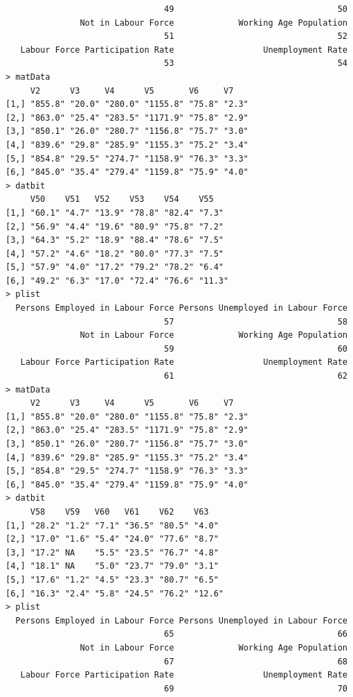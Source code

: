 \documentclass[a4paper]{article}
\begin{document}
\begin{verbatim}
                                49                                 50 
               Not in Labour Force             Working Age Population 
                                51                                 52 
   Labour Force Participation Rate                  Unemployment Rate 
                                53                                 54 
> matData 
     V2      V3     V4      V5       V6     V7   
[1,] "855.8" "20.0" "280.0" "1155.8" "75.8" "2.3"
[2,] "863.0" "25.4" "283.5" "1171.9" "75.8" "2.9"
[3,] "850.1" "26.0" "280.7" "1156.8" "75.7" "3.0"
[4,] "839.6" "29.8" "285.9" "1155.3" "75.2" "3.4"
[5,] "854.8" "29.5" "274.7" "1158.9" "76.3" "3.3"
[6,] "845.0" "35.4" "279.4" "1159.8" "75.9" "4.0"
> datbit 
     V50    V51   V52    V53    V54    V55   
[1,] "60.1" "4.7" "13.9" "78.8" "82.4" "7.3" 
[2,] "56.9" "4.4" "19.6" "80.9" "75.8" "7.2" 
[3,] "64.3" "5.2" "18.9" "88.4" "78.6" "7.5" 
[4,] "57.2" "4.6" "18.2" "80.0" "77.3" "7.5" 
[5,] "57.9" "4.0" "17.2" "79.2" "78.2" "6.4" 
[6,] "49.2" "6.3" "17.0" "72.4" "76.6" "11.3"
> plist 
  Persons Employed in Labour Force Persons Unemployed in Labour Force 
                                57                                 58 
               Not in Labour Force             Working Age Population 
                                59                                 60 
   Labour Force Participation Rate                  Unemployment Rate 
                                61                                 62 
> matData 
     V2      V3     V4      V5       V6     V7   
[1,] "855.8" "20.0" "280.0" "1155.8" "75.8" "2.3"
[2,] "863.0" "25.4" "283.5" "1171.9" "75.8" "2.9"
[3,] "850.1" "26.0" "280.7" "1156.8" "75.7" "3.0"
[4,] "839.6" "29.8" "285.9" "1155.3" "75.2" "3.4"
[5,] "854.8" "29.5" "274.7" "1158.9" "76.3" "3.3"
[6,] "845.0" "35.4" "279.4" "1159.8" "75.9" "4.0"
> datbit 
     V58    V59   V60   V61    V62    V63   
[1,] "28.2" "1.2" "7.1" "36.5" "80.5" "4.0" 
[2,] "17.0" "1.6" "5.4" "24.0" "77.6" "8.7" 
[3,] "17.2" NA    "5.5" "23.5" "76.7" "4.8" 
[4,] "18.1" NA    "5.0" "23.7" "79.0" "3.1" 
[5,] "17.6" "1.2" "4.5" "23.3" "80.7" "6.5" 
[6,] "16.3" "2.4" "5.8" "24.5" "76.2" "12.6"
> plist 
  Persons Employed in Labour Force Persons Unemployed in Labour Force 
                                65                                 66 
               Not in Labour Force             Working Age Population 
                                67                                 68 
   Labour Force Participation Rate                  Unemployment Rate 
                                69                                 70 

\end{verbatim}
\end{document}
